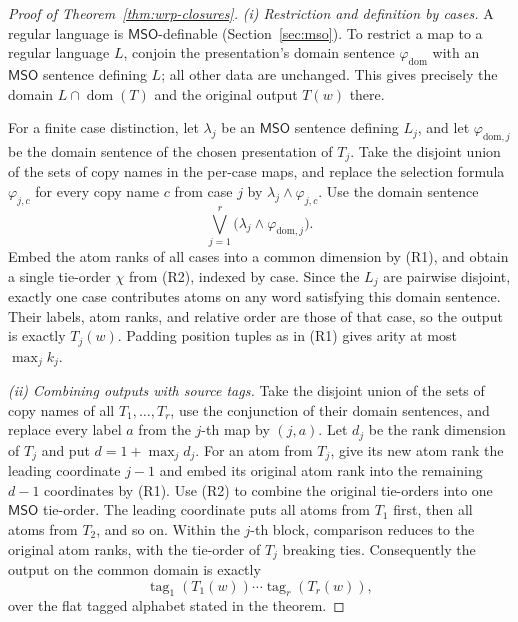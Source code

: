 \documentclass[11pt]{article}
\theoremstyle{definition}
\newcommand{\MSO}{\mathsf{MSO}}
\begin{document}
\begin{proof}[Proof of Theorem~\ref{thm:wrp-closures}]
\vspace{0.5em}
\noindent\emph{(i) Restriction and definition by cases.}
A regular language is $\MSO$-definable (Section~\ref{sec:mso}).  To restrict a
map to a regular language $L$, conjoin the presentation's domain sentence
$\varphi_{\mathrm{dom}}$ with an $\MSO$ sentence defining $L$; all other data
are unchanged.  This gives precisely the domain
$L\cap\operatorname{dom}(T)$ and the original output $T(w)$ there.

For a finite case distinction, let $\lambda_j$ be an $\MSO$ sentence defining
$L_j$, and let $\varphi_{\mathrm{dom},j}$ be the domain sentence of the chosen
presentation of $T_j$.  Take the disjoint union of the sets of copy names in the
per-case maps, and replace the selection formula $\varphi_{j,c}$ for every copy
name $c$ from case $j$ by $\lambda_j\wedge\varphi_{j,c}$.  Use the domain sentence
\[
   \bigvee_{j=1}^r
   \bigl(\lambda_j\wedge\varphi_{\mathrm{dom},j}\bigr).
\]
Embed the atom ranks of all cases into a common dimension by (R1), and obtain a
single tie-order $\chi$ from (R2), indexed by case.  Since the $L_j$ are pairwise
disjoint, exactly one case contributes atoms on any word satisfying this
domain sentence.
Their labels, atom ranks, and relative order are those of that case, so the
output is exactly $T_j(w)$.  Padding position tuples as in (R1) gives arity at
most $\max_j k_j$.

\vspace{0.5em}
\noindent\emph{(ii) Combining outputs with source tags.}
Take the disjoint union of the sets of copy names of all $T_1,\ldots,T_r$, use
the conjunction of their domain sentences, and replace every label $a$ from the
$j$-th map by $(j,a)$.  Let $d_j$ be the rank dimension of $T_j$ and put
$d=1+\max_j d_j$.  For an atom from $T_j$, give its new atom rank the leading
coordinate $j-1$ and embed its original atom rank into the remaining $d-1$
coordinates by (R1).  Use (R2) to combine the original tie-orders into one
$\MSO$ tie-order.  The leading coordinate puts all atoms from $T_1$ first,
then all atoms from $T_2$, and so on.  Within the $j$-th block, comparison
reduces to the original atom ranks, with the tie-order of $T_j$ breaking ties.
Consequently the output
on the common domain is exactly
\[
   \operatorname{tag}_1(T_1(w))\cdots
   \operatorname{tag}_r(T_r(w)),
\]
over the flat tagged alphabet stated in the theorem.


\end{proof}
\end{document}
